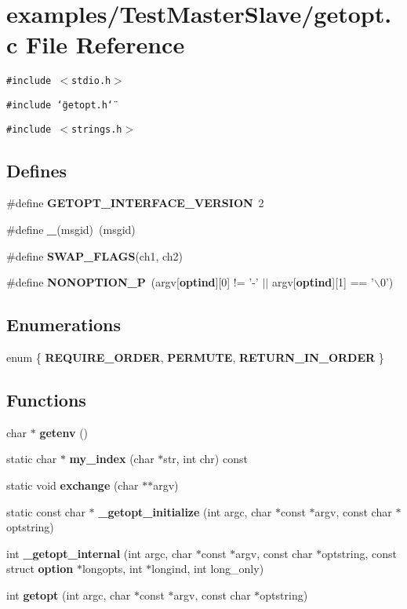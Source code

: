 \section{examples/Test\-Master\-Slave/getopt.c File Reference}
\label{TestMasterSlave_2getopt_8c}
{\tt \#include $<$stdio.h$>$}\par
{\tt \#include \char`\"{}getopt.h\char`\"{}}\par
{\tt \#include $<$strings.h$>$}\par
\subsection*{Defines}
\begin{CompactItemize}
\item 
\#define {\bf GETOPT\_\-INTERFACE\_\-VERSION}~2
\item 
\#define {\bf \_\-}(msgid)~(msgid)
\item 
\#define {\bf SWAP\_\-FLAGS}(ch1, ch2)
\item 
\#define {\bf NONOPTION\_\-P}~(argv[{\bf optind}][0] != '-' $|$$|$ argv[{\bf optind}][1] == '$\backslash$0')
\end{CompactItemize}
\subsection*{Enumerations}
\begin{CompactItemize}
\item 
enum \{ {\bf REQUIRE\_\-ORDER}, 
{\bf PERMUTE}, 
{\bf RETURN\_\-IN\_\-ORDER}
 \}
\end{CompactItemize}
\subsection*{Functions}
\begin{CompactItemize}
\item 
char $\ast$ {\bf getenv} ()
\item 
static char $\ast$ {\bf my\_\-index} (char $\ast$str, int chr) const
\item 
static void {\bf exchange} (char $\ast$$\ast$argv)
\item 
static const char $\ast$ {\bf \_\-getopt\_\-initialize} (int argc, char $\ast$const $\ast$argv, const char $\ast$optstring)
\item 
int {\bf \_\-getopt\_\-internal} (int argc, char $\ast$const $\ast$argv, const char $\ast$optstring, const struct {\bf option} $\ast$longopts, int $\ast$longind, int long\_\-only)
\item 
int {\bf getopt} (int argc, char $\ast$const $\ast$argv, const char $\ast$optstring)
\end{CompactItemize}
